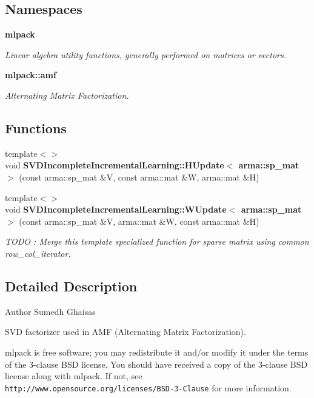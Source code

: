 \subsection*{Namespaces}
\begin{DoxyCompactItemize}
\item 
 \textbf{ mlpack}
\begin{DoxyCompactList}\small\item\em Linear algebra utility functions, generally performed on matrices or vectors. \end{DoxyCompactList}\item 
 \textbf{ mlpack\+::amf}
\begin{DoxyCompactList}\small\item\em Alternating Matrix Factorization. \end{DoxyCompactList}\end{DoxyCompactItemize}
\subsection*{Functions}
\begin{DoxyCompactItemize}
\item 
{\footnotesize template$<$$>$ }\\void \textbf{ S\+V\+D\+Incomplete\+Incremental\+Learning\+::\+H\+Update$<$ arma\+::sp\+\_\+mat $>$} (const arma\+::sp\+\_\+mat \&V, const arma\+::mat \&W, arma\+::mat \&H)
\item 
{\footnotesize template$<$$>$ }\\void \textbf{ S\+V\+D\+Incomplete\+Incremental\+Learning\+::\+W\+Update$<$ arma\+::sp\+\_\+mat $>$} (const arma\+::sp\+\_\+mat \&V, arma\+::mat \&W, const arma\+::mat \&H)
\begin{DoxyCompactList}\small\item\em T\+O\+DO \+: Merge this template specialized function for sparse matrix using common row\+\_\+col\+\_\+iterator. \end{DoxyCompactList}\end{DoxyCompactItemize}


\subsection{Detailed Description}
\begin{DoxyAuthor}{Author}
Sumedh Ghaisas
\end{DoxyAuthor}
S\+VD factorizer used in A\+MF (Alternating Matrix Factorization).

mlpack is free software; you may redistribute it and/or modify it under the terms of the 3-\/clause B\+SD license. You should have received a copy of the 3-\/clause B\+SD license along with mlpack. If not, see {\tt http\+://www.\+opensource.\+org/licenses/\+B\+S\+D-\/3-\/\+Clause} for more information. 
